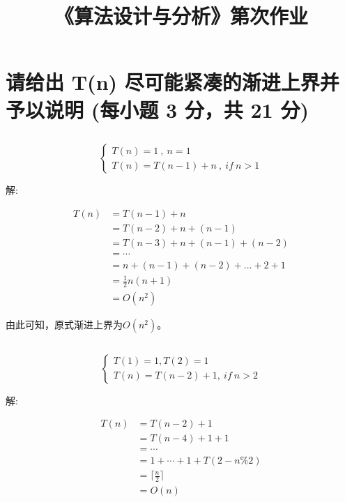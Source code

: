 \documentclass{article}
\title{\heiti \myCollege《算法设计与分析》第\myHomeworkId 次作业} %
\author{\myCollege \quad \myId \quad \myName} %
\begin{document}
\maketitle

\section{请给出 T(n) 尽可能紧凑的渐进上界并予以说明 (每小题 3 分，共 21 分)} %

\subsection{} %


$$
\left\{
\begin{array}{l}
T(n)=1\ ,\ n=1\\
T(n)=T(n-1)+n\ ,\ if\ n>1
\end{array}
\right.
$$

解:

\begin{align*}
T(n)&=T(n-1)+n\\
    &=T(n-2)+n+(n-1)\\
    &=T(n-3)+n+(n-1)+(n-2)\\
    &=\cdots \\
    &=n+(n-1)+(n-2)+...+2+1\\
    &=\frac{1}{2}n(n+1)\\
    &=O(n^2)
\end{align*}


\quad\quad\quad\quad 由此可知，原式渐进上界为$O(n^2)$。


\subsection{} %

$$
\left\{
\begin{array}{l}
T(1) = 1, T(2) = 1\\
T(n) = T(n-2) +1,\ if \ n>2
\end{array}
\right.
$$

解:

\begin{align*}
T(n)&=T(n-2)+1\\
    &=T(n-4)+1+1\\
    &=\cdots \\
    &=1+\cdots + 1 + T(2-n\%2)\\
    &=\lceil \frac{n}{2} \rceil\\
    &=O(n)
\end{align*}
\end{document}
